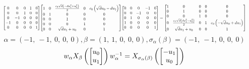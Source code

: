 \documentclass[11pt]{article}
\theoremstyle{definition}
\begin{document}
\[
\scaletoalign{\textwidth}{{\left[\begin{matrix}0 & 0 & 0 & 1 & 0\\0 & 0 & 1 & 0 & 0\\0 & -1 & 0 & 0 & 0\\-1 & 0 & 0 & 0 & 0\\0 & 0 & 0 & 0 & 1\end{matrix}\right]} {\left[\begin{matrix}1 & 0 & \frac{c_{0} \sqrt{d} \left(- d u_{1}^{2} + u_{0}^{2}\right)}{2} & 0 & c_{0} \left(\sqrt{d} u_{0} - d u_{1}\right)\\0 & 1 & 0 & 0 & 0\\0 & 0 & 1 & 0 & 0\\0 & 0 & 0 & 1 & 0\\0 & 0 & \sqrt{d} u_{1} + u_{0} & 0 & 1\end{matrix}\right]} {\left[\begin{matrix}0 & 0 & 0 & -1 & 0\\0 & 0 & -1 & 0 & 0\\0 & 1 & 0 & 0 & 0\\1 & 0 & 0 & 0 & 0\\0 & 0 & 0 & 0 & 1\end{matrix}\right]} = {\left[\begin{matrix}1 & 0 & 0 & 0 & 0\\0 & 1 & 0 & 0 & 0\\0 & 0 & 1 & 0 & 0\\0 & \frac{c_{0} \sqrt{d} \left(d u_{1}^{2} - u_{0}^{2}\right)}{2} & 0 & 1 & c_{0} \left(- \sqrt{d} u_{0} + d u_{1}\right)\\0 & \sqrt{d} u_{1} + u_{0} & 0 & 0 & 1\end{matrix}\right]}}
\]
\[
\alpha = \left( -1, \  -1, \  0, \  0, \  0\right), \beta = \left( 1, \  1, \  0, \  0, \  0\right), \sigma_{\alpha}(\beta) = \left( -1, \  -1, \  0, \  0, \  0\right)
\]
\[
\scaletoalign{\textwidth}{w_{\alpha} X_{\beta}\left(\left[\begin{matrix}u_{0}\\u_{1}\end{matrix}\right]\right) w_{\alpha}^{-1} = X_{\sigma_{\alpha}\left(\beta\right)}\left(\left[\begin{matrix}- u_{1}\\u_{0}\end{matrix}\right]\right)}
\]
\end{document}
